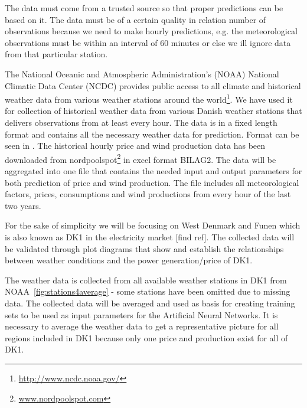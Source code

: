 
The data must come from a trusted source so that proper predictions can be based on it. The data must be of a certain quality in relation number of observations because we need to make hourly predictions, e.g. the meteorological observations must be within an interval of 60 minutes or else we ill ignore data from that particular station.

The National Oceanic and Atmospheric Administration's (NOAA) National Climatic Data Center (NCDC) provides public access to all climate and historical weather data from various weather stations around the world\footnote{\url{http://www.ncdc.noaa.gov/}}. We have used it for collection of historical weather data from various Danish weather stations that delivers observations from at least every hour. The data is in a fixed length format and contains all the necessary weather data for prediction. Format can be seen in . 
The historical hourly price and wind production data has been downloaded from nordpoolspot\footnote{\url{www.nordpoolspot.com}} in excel format BILAG2.
The data will be aggregated into one file that contains the needed input and output parameters for both prediction of price and wind production. The file includes all meteorological factors, prices, consumptions and wind productions from every hour of the last two years. 

For the sake of simplicity we will be focusing on West Denmark and Funen which is also known as DK1 in the electricity market [find ref]. The collected data will be validated through plot diagrams that show and establish the relationships between weather conditions and the power generation/price of DK1.

The weather data is collected from all available weather stations in DK1 from NOAA~\ref{fig:stations4average} - some stations have been omitted due to missing data. The collected data will be averaged and used as basis for creating training sets to be used as input parameters for the Artificial Neural Networks. It is necessary to average the weather data to get a representative picture for all regions included in DK1 because only one price and production exist for all of DK1.


